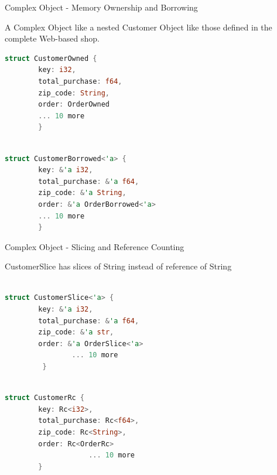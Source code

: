 \documentclass[9pt]{beamer}
\begin{document}

\begin{frame}[fragile]{Complex Object - Memory Ownership and Borrowing}

A Complex Object like a nested Customer Object like those defined in the complete Web-based shop. 
 

\centering
\begin{minipage}{0.8\linewidth}
\begin{lstlisting}[title={Memory Ownership},language=Rust]
struct CustomerOwned {
		key: i32,
		total_purchase: f64,
		zip_code: String,
		order: OrderOwned
		... 10 more 
        }
\end{lstlisting}
\end{minipage}    


\begin{minipage}{0.8\linewidth}
\begin{lstlisting}[title={Memory Borrowing},language=Rust]

struct CustomerBorrowed<'a> {
		key: &'a i32,
		total_purchase: &'a f64,
		zip_code: &'a String,
		order: &'a OrderBorrowed<'a>
		... 10 more 
        }
\end{lstlisting}
\end{minipage}    
\end{frame}





\begin{frame}[t,fragile]{Complex Object - Slicing and Reference Counting }

CustomerSlice has slices of String instead of reference of String
\centering
    
\begin{minipage}{0.8\linewidth}
\begin{lstlisting}[title={Memory Slicing},language=Rust]

struct CustomerSlice<'a> {
		key: &'a i32,
		total_purchase: &'a f64,
		zip_code: &'a str,
		order: &'a OrderSlice<'a>
        		... 10 more 
         }
\end{lstlisting}
\end{minipage}    

\begin{minipage}{0.8\linewidth}
\begin{lstlisting}[title={Atomic Reference Counting },language=Rust]

struct CustomerRc {
		key: Rc<i32>,
		total_purchase: Rc<f64>,
		zip_code: Rc<String>,
		order: Rc<OrderRc>
		      		... 10 more 
        }
\end{lstlisting}
\end{minipage}   

\end{frame}
\end{document}
